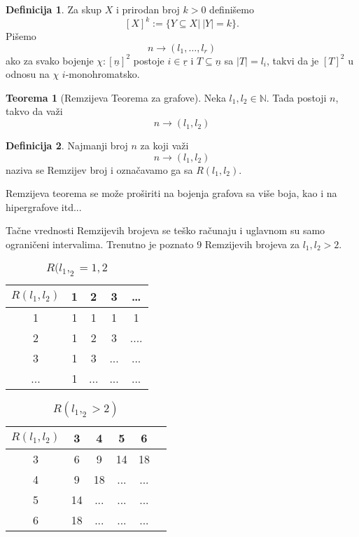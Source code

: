 \documentclass{article}
\theoremstyle{definition}
\newtheorem{definicija}{Definicija}[section]
\newtheorem{teorema}{Teorema}[section]
\begin{document}
	\begin{definicija}
		Za skup $X$ i prirodan broj $k>0$ definišemo
		\[
		[X]^k :=\{Y\subseteq X | \:|Y|=k\}.
		\]
		Pišemo
		\[
		n\rightarrow (l_1,\ldots,l_r)
		\]
		ako za svako bojenje $\chi:[\underline{n}]^2$ postoje $i\in \underline{r}$ i $T\subseteq \underline{n}$ sa $|T|=l_i$, takvi da je $[T]^2$ u odnosu na $\chi$ $i$-monohromatsko.	
	\end{definicija}
	\begin{teorema}[Remzijeva Teorema za grafove]
		Neka $l_1,l_2 \in \mathbb{N}$. Tada postoji $n$, takvo da važi
		\[
		n\rightarrow(l_1,l_2)
		\]
	\end{teorema}
	
	\begin{definicija}
		Najmanji broj $n$ za koji važi
		\[
		n\rightarrow(l_1,l_2)
		\]
		naziva se Remzijev broj i označavamo ga sa $R(l_1,l_2)$.
	\end{definicija}
	
	Remzijeva teorema se može proširiti na bojenja grafova sa više boja, kao i na hipergrafove itd...
	
	
	Tačne vrednosti Remzijevih brojeva se teško računaju i uglavnom su samo ograničeni intervalima. Trenutno je poznato 9 Remzijevih brojeva za $l_1,l_2>2$.
	\newline
	\begin{table}[h]
		\centering
		\begin{tabular}{|c|c|c|c|c|}
			\hline
			$R(l_1,l_2)$   &  1 & 2 & 3 & \ldots \\
			\hline
			1  & 1 & 1 & 1 &  1 \\
			\hline
			2 & 1 & 2 & 3 & ....\\
			\hline
			3 & 1 & 3 & ... & ... \\
			\hline
			... & 1 & ... & ... & ... \\
			\hline
		\end{tabular}
		\caption{$R(l_1,_2=1,2$}
	\end{table}
	
	\begin{table}[h]
		\centering
		\begin{tabular}{|c|c|c|c|c|c|}
			\hline
			$R(l_1,l_2)$    &  3 & 4 & 5 & 6 \\
			\hline
			3  & 6 & 9 & 14 &  18 \\
			\hline
			4 & 9 & 18 & ... & ...\\
			\hline
			5 & 14 & ... & ... & ... \\
			\hline
			6 & 18 & ... & ... & ... \\
			\hline
		\end{tabular}
		\caption{$R(l_1,_2>2)$}
	\end{table}
	
\end{document}
